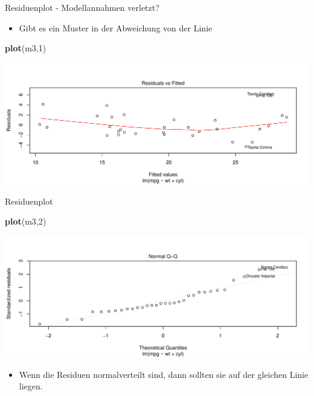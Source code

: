 \documentclass[ignorenonframetext,]{beamer}
\newenvironment{Shaded}{\begin{snugshade}}{\end{snugshade}}
\newcommand{\KeywordTok}[1]{\textcolor[rgb]{0.13,0.29,0.53}{\textbf{#1}}}
\newcommand{\DecValTok}[1]{\textcolor[rgb]{0.00,0.00,0.81}{#1}}
\newcommand{\NormalTok}[1]{#1}
\providecommand{\tightlist}{%
  \setlength{\itemsep}{0pt}\setlength{\parskip}{0pt}}
\begin{document}
\begin{frame}[fragile]{Residuenplot - Modellannahmen verletzt?}

\begin{itemize}
\tightlist
\item
  Gibt es ein Muster in der Abweichung von der Linie
\end{itemize}

\begin{Shaded}
\begin{Highlighting}[]
\KeywordTok{plot}\NormalTok{(m3,}\DecValTok{1}\NormalTok{)}
\end{Highlighting}
\end{Shaded}

\includegraphics{B3_linreg_files/figure-beamer/unnamed-chunk-23-1.pdf}

\end{frame}

\begin{frame}[fragile]{Residuenplot}

\begin{Shaded}
\begin{Highlighting}[]
\KeywordTok{plot}\NormalTok{(m3,}\DecValTok{2}\NormalTok{)}
\end{Highlighting}
\end{Shaded}

\includegraphics{B3_linreg_files/figure-beamer/unnamed-chunk-24-1.pdf}

\begin{itemize}
\tightlist
\item
  Wenn die Residuen normalverteilt sind, dann sollten sie auf der
  gleichen Linie liegen.
\end{itemize}

\end{frame}
\end{document}
